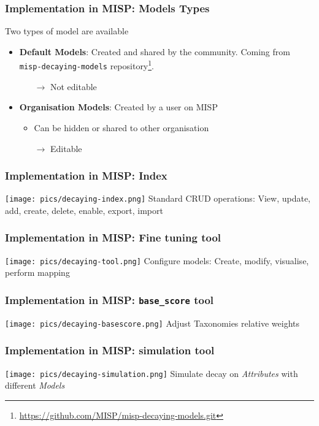 \begin{frame}
    \frametitle{Implementation in MISP: Models Types}
    Two types of model are available
    \begin{itemize}
        \item \textbf{Default Models}: Created and shared by the community. Coming from \texttt{misp-decaying-models} repository\footnote{\url{https://github.com/MISP/misp-decaying-models.git}}.
        \begin{itemize}
            \item[$\rightarrow$] Not editable
        \end{itemize}
    \vspace{0.5cm}
    \item \textbf{Organisation Models}: Created by a user on MISP
        \begin{itemize}
            \item Can be hidden or shared to other organisation 
            \item[$\rightarrow$] Editable
        \end{itemize}
    \end{itemize}
\end{frame}

\begin{frame}
    \frametitle{Implementation in MISP: Index}
    \texttt{[image: pics/decaying-index.png]}
    Standard CRUD operations: View, update, add, create, delete, enable, export, import
\end{frame}

\begin{frame}
    \frametitle{Implementation in MISP: Fine tuning tool}
    \texttt{[image: pics/decaying-tool.png]}
    Configure models: Create, modify, visualise, perform mapping
\end{frame}

\begin{frame}
    \frametitle{Implementation in MISP: \texttt{base\_score} tool}
    \texttt{[image: pics/decaying-basescore.png]}
    Adjust Taxonomies relative weights
\end{frame}

\begin{frame}
    \frametitle{Implementation in MISP: simulation tool}
    \texttt{[image: pics/decaying-simulation.png]}
    Simulate decay on \textit{Attributes} with different \textit{Models}
\end{frame}


